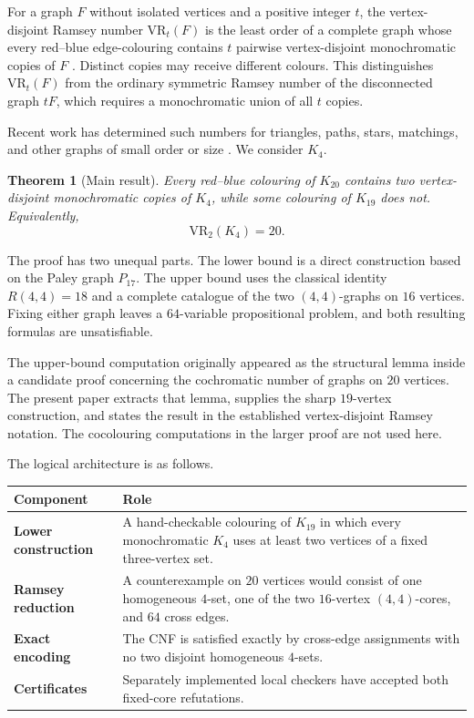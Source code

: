 \documentclass[11pt,a4paper]{article}
\newtheorem{theorem}{Theorem}[section]
\theoremstyle{definition}
\theoremstyle{remark}
\begin{document}
For a graph \(F\) without isolated vertices and a positive integer \(t\),
the vertex-disjoint Ramsey number \(\mathrm{VR}_t(F)\) is the least order
of a complete graph whose every red--blue edge-colouring contains \(t\)
pairwise vertex-disjoint monochromatic copies of \(F\)
\cite{jent-osborn-zhang,jent-zhang}.  Distinct copies may receive different
colours.  This distinguishes \(\mathrm{VR}_t(F)\) from the ordinary
symmetric Ramsey number of the disconnected graph \(tF\), which requires
a monochromatic union of all \(t\) copies.

Recent work has determined such numbers for triangles, paths, stars,
matchings, and other graphs of small order or size
\cite{jent-osborn-zhang,jent-zhang}.  We consider \(K_4\).

\begin{theorem}[Main result]\label{thm:main}
Every red--blue colouring of \(K_{20}\) contains two vertex-disjoint
monochromatic copies of \(K_4\), while some colouring of \(K_{19}\) does
not.  Equivalently,
\[
  \boxed{\mathrm{VR}_2(K_4)=20}.
\]
\end{theorem}

The proof has two unequal parts.  The lower bound is a direct construction
based on the Paley graph \(P_{17}\).  The upper bound uses the classical
identity \(R(4,4)=18\) and a complete catalogue of the two
\((4,4)\)-graphs on \(16\) vertices.  Fixing either graph leaves a
\(64\)-variable propositional problem, and both resulting formulas are
unsatisfiable.

The upper-bound computation originally appeared as the structural lemma
inside a candidate proof concerning the cochromatic number of graphs on
\(20\) vertices.  The present paper extracts that lemma, supplies the
sharp \(19\)-vertex construction, and states the result in the established
vertex-disjoint Ramsey notation.  The cocolouring computations in the
larger proof are not used here.

The logical architecture is as follows.

\begin{center}
\begin{tabularx}{0.96\textwidth}{@{}>{\bfseries}p{} X@{}}
\toprule
Component & Role\\
\midrule
Lower construction &
A hand-checkable colouring of \(K_{19}\) in which every monochromatic
\(K_4\) uses at least two vertices of a fixed three-vertex set.\\
Ramsey reduction &
A counterexample on \(20\) vertices would consist of one homogeneous
\(4\)-set, one of the two \(16\)-vertex \((4,4)\)-cores, and \(64\)
cross edges.\\
Exact encoding &
The CNF is satisfied exactly by cross-edge assignments with no two
disjoint homogeneous \(4\)-sets.\\
Certificates &
Separately implemented local checkers have accepted both fixed-core
refutations.\\
\bottomrule
\end{tabularx}
\end{center}
\end{document}
